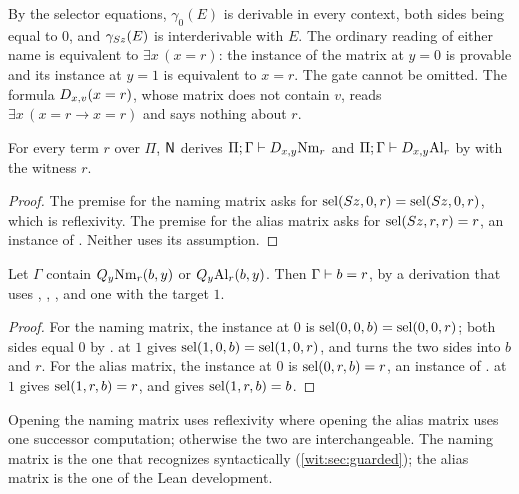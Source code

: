 By the selector equations, $\gamma_0(E)$ is derivable in every context, both
sides being equal to $0$, and $\gamma_{S z}(E)$ is interderivable with
$E$.  The ordinary reading of either name is equivalent to
$\exists x\,(x=r)$: the instance of the matrix at $y=0$ is provable and its
instance at $y=1$ is equivalent to $x=r$.  The gate cannot be omitted.  The
formula $D_{x,v}(x=r)$, whose matrix does not contain $v$, reads
$\exists x\,(x=r\to x=r)$ and says nothing about $r$.

\begin{lemma}
\label{wit:lem:name-in-N}
For every term $r$ over $\Pi$, $\mathsf{N}$ derives
$\Pi;\Gamma\vdash D_{x,y}\mathrm{Nm}_r$ and
$\Pi;\Gamma\vdash D_{x,y}\mathrm{Al}_r$ by  with the witness
$r$.
\end{lemma}

\begin{proof}
The premise for the naming matrix asks for
$\operatorname{sel}(S z,0,r)=\operatorname{sel}(S z,0,r)$, which is reflexivity.  The premise for
the alias matrix asks for $\operatorname{sel}(S z,r,r)=r$, an instance of
.  Neither uses its assumption.
\end{proof}

\begin{lemma}
\label{wit:lem:open-name}
Let $\Gamma$ contain $Q_{y}\mathrm{Nm}_r(b,y)$ or
$Q_{y}\mathrm{Al}_r(b,y)$.  Then $\Gamma\vdash b=r$, by a derivation that
uses , , ,  and one
 with the target $1$.
\end{lemma}

\begin{proof}
For the naming matrix, the instance at $0$ is
$\operatorname{sel}(0,0,b)=\operatorname{sel}(0,0,r)$; both sides equal $0$ by .
 at $1$ gives $\operatorname{sel}(1,0,b)=\operatorname{sel}(1,0,r)$, and 
turns the two sides into $b$ and $r$.  For the alias matrix, the instance at
$0$ is $\operatorname{sel}(0,r,b)=r$, an instance of .   at $1$
gives $\operatorname{sel}(1,r,b)=r$, and  gives $\operatorname{sel}(1,r,b)=b$.
\end{proof}

Opening the naming matrix uses reflexivity where opening the alias matrix
uses one successor computation; otherwise the two are interchangeable.  The
naming matrix is the one that  recognizes
syntactically (\cref{wit:sec:guarded}); the alias matrix is the one of the
Lean development.

